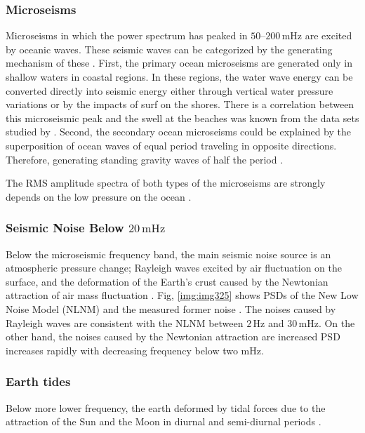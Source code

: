 \subsubsection{Microseisms}
Microseisms in which the power spectrum has peaked in $50$--$200\,\mathrm{mHz}$ are excited by oceanic waves. These seismic waves can be categorized by the generating mechanism of these \cite{Bormann2012new}. First, the primary ocean microseisms are generated only in shallow waters in coastal regions. In these regions, the water wave energy can be converted directly into seismic energy either through vertical water pressure variations or by the impacts of surf on the shores. There is a correlation between this microseismic peak and the swell at the beaches was known from the data sets studied by \cite{haubrich1963comparative}. Second, the secondary ocean microseisms could be explained by the superposition of ocean waves of equal period traveling in opposite directions. Therefore, generating standing gravity waves of half the period \cite{longuet1950theory}.

The RMS amplitude spectra of both types of the microseisms are strongly depends on the low pressure on the ocean \cite{naticchioni2014microseismic}.

\subsubsection{Seismic Noise Below $20\,\mathrm{mHz}$}
Below the microseismic frequency band, the main seismic noise source is an atmospheric pressure change; Rayleigh waves excited by air fluctuation on the surface, and the deformation of the Earth's crust caused by the Newtonian attraction of air mass fluctuation \cite{sorrells1971earth,zurn1995noise}. Fig, \ref{img:img325} shows PSDs of the New Low Noise Model (NLNM) \cite{peterson1993observations} and the measured former noise \cite{nishida2002origin}. The noises caused by Rayleigh waves are consistent with the NLNM between $2\,\mathrm{Hz}$ and $30\,\mathrm{mHz}$. On the other hand, the noises caused by the Newtonian attraction are increased PSD increases rapidly with decreasing frequency below two mHz.


\subsubsection{Earth tides}
Below more lower frequency, the earth deformed by tidal forces due to the attraction of the Sun and the Moon in diurnal and semi-diurnal periods \cite{agnew2005earth}. 

